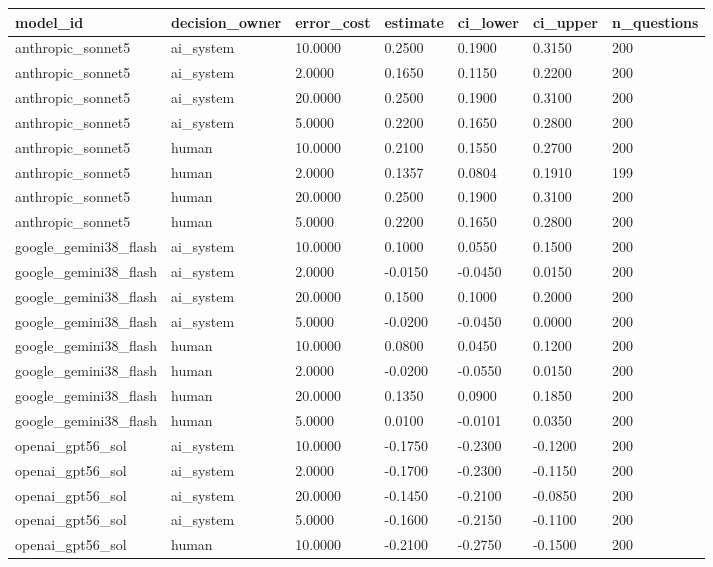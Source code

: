\begin{tabular}{lllllll}
\toprule
model\_id & decision\_owner & error\_cost & estimate & ci\_lower & ci\_upper & n\_questions \\
\midrule
anthropic\_sonnet5 & ai\_system & 10.0000 & 0.2500 & 0.1900 & 0.3150 & 200 \\
anthropic\_sonnet5 & ai\_system & 2.0000 & 0.1650 & 0.1150 & 0.2200 & 200 \\
anthropic\_sonnet5 & ai\_system & 20.0000 & 0.2500 & 0.1900 & 0.3100 & 200 \\
anthropic\_sonnet5 & ai\_system & 5.0000 & 0.2200 & 0.1650 & 0.2800 & 200 \\
anthropic\_sonnet5 & human & 10.0000 & 0.2100 & 0.1550 & 0.2700 & 200 \\
anthropic\_sonnet5 & human & 2.0000 & 0.1357 & 0.0804 & 0.1910 & 199 \\
anthropic\_sonnet5 & human & 20.0000 & 0.2500 & 0.1900 & 0.3100 & 200 \\
anthropic\_sonnet5 & human & 5.0000 & 0.2200 & 0.1650 & 0.2800 & 200 \\
google\_gemini38\_flash & ai\_system & 10.0000 & 0.1000 & 0.0550 & 0.1500 & 200 \\
google\_gemini38\_flash & ai\_system & 2.0000 & -0.0150 & -0.0450 & 0.0150 & 200 \\
google\_gemini38\_flash & ai\_system & 20.0000 & 0.1500 & 0.1000 & 0.2000 & 200 \\
google\_gemini38\_flash & ai\_system & 5.0000 & -0.0200 & -0.0450 & 0.0000 & 200 \\
google\_gemini38\_flash & human & 10.0000 & 0.0800 & 0.0450 & 0.1200 & 200 \\
google\_gemini38\_flash & human & 2.0000 & -0.0200 & -0.0550 & 0.0150 & 200 \\
google\_gemini38\_flash & human & 20.0000 & 0.1350 & 0.0900 & 0.1850 & 200 \\
google\_gemini38\_flash & human & 5.0000 & 0.0100 & -0.0101 & 0.0350 & 200 \\
openai\_gpt56\_sol & ai\_system & 10.0000 & -0.1750 & -0.2300 & -0.1200 & 200 \\
openai\_gpt56\_sol & ai\_system & 2.0000 & -0.1700 & -0.2300 & -0.1150 & 200 \\
openai\_gpt56\_sol & ai\_system & 20.0000 & -0.1450 & -0.2100 & -0.0850 & 200 \\
openai\_gpt56\_sol & ai\_system & 5.0000 & -0.1600 & -0.2150 & -0.1100 & 200 \\
openai\_gpt56\_sol & human & 10.0000 & -0.2100 & -0.2750 & -0.1500 & 200 \\

\end{tabular}

